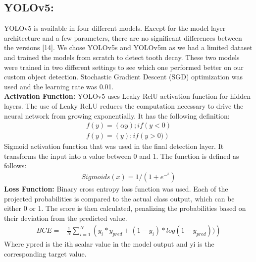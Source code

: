 \subsection{YOLOv5:} YOLOv5 is available in four different models. Except for the model layer architecture and a few parameters, there are no significant differences between the versions [14]. We chose YOLOv5s and YOLOv5m as we had a limited dataset and trained the models from scratch to detect tooth decay. These two models were trained in two different settings to see which one performed better on our custom object detection. Stochastic Gradient Descent (SGD) optimization was used and the learning rate was 0.01.\\ 
\textbf{Activation Function: } YOLOv5 uses Leaky RelU activation function for hidden layers. The use of Leaky ReLU reduces the computation necessary to drive the neural network from growing exponentially. It has the following definition:\\
\begin{align*}
f\left ( y \right )= \left ( \alpha y \right ); if \left ( y< 0 \right )\\
f\left ( y \right )= \left (  y \right );if \left ( y> 0) \right ) 
\end{align*}
Sigmoid activation function that was used in the final detection layer. It transforms the input into a value between 0 and 1. The function is defined as follows: \\
\begin{align*}
Sigmoid s(x)=1/(1+e^-^x)
\end{align*}
\textbf{Loss Function: } Binary cross entropy loss function was used. Each of the projected probabilities is compared to the actual class output, which can be either 0 or 1. The score is then calculated, penalizing the probabilities based on their deviation from the predicted value.\\
\begin{align*}
 BCE= -\frac{1}{N}\sum_{i=1}^{N}\left ( y_{i} *y_{pred}+(1-y_{i})*log(1-y_{pred}))\right )
 \end{align*}
Where ypred is the ith scalar value in the model output and yi is the corresponding target value.
